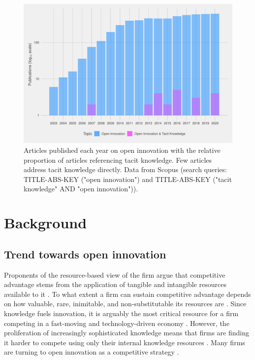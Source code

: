 \begin{figure}[p]
\centering
\includegraphics[width=0.9\linewidth]{Images/tk_oi.pdf}
\caption[Articles published each year on open innovation]{Articles published each year on open innovation with the relative proportion of articles referencing tacit knowledge. Few articles address tacit knowledge directly. Data from Scopus (search queries: TITLE-ABS-KEY ("open innovation") and TITLE-ABS-KEY ("tacit knowledge"  AND  "open innovation")).}
\label{fig:biblio}
\end{figure}

\section{Background}

\subsection{Trend towards open innovation}

Proponents of the resource-based view of the firm argue that competitive advantage stems from the application of tangible and intangible resources available to it \citep{wernerfelt1984resource,peteraf1993cornerstones}. To what extent a firm can sustain competitive advantage depends on how valuable, rare, inimitable, and non-substitutable its resources are \citep{barney1991firm}. Since knowledge fuels innovation, it is arguably the most critical resource for a firm competing in a fast-moving and technology-driven economy \citep{grant1996toward,urbancova2013competitive}. However, the proliferation of increasingly sophisticated knowledge means that firms are finding it harder to compete using only their internal knowledge resources \citep{chesbrough2009open,enkel2009open}. Many firms are turning to open innovation as a competitive strategy \citep{chesbrough2003open,enkel2009open,stanko2017under}. \medskip

